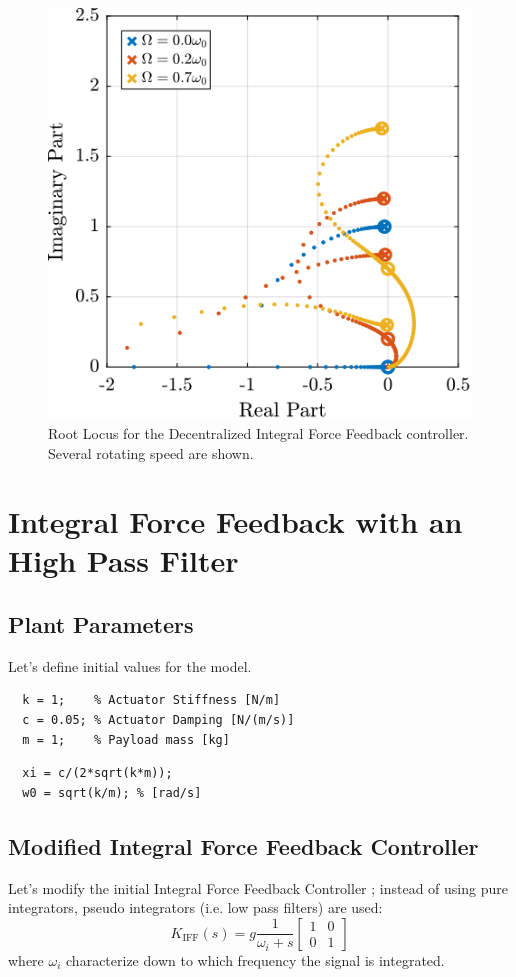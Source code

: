 \documentclass[a4paper, 10pt, DIV=12, parskip=full]{scrreprt}
\begin{document}
\begin{figure}[htbp]
\centering
\includegraphics[scale=1]{figs/root_locus_pure_iff.png}
\caption{\label{fig:root_locus_pure_iff}Root Locus for the Decentralized Integral Force Feedback controller. Several rotating speed are shown.}
\end{figure}

\chapter{Integral Force Feedback with an High Pass Filter}
\label{sec:orgf9854e9}
\label{sec:iff_pseudo_int}

\section{Plant Parameters}
\label{sec:org11b9a15}
Let's define initial values for the model.
\begin{verbatim}
  k = 1;    % Actuator Stiffness [N/m]
  c = 0.05; % Actuator Damping [N/(m/s)]
  m = 1;    % Payload mass [kg]
\end{verbatim}

\begin{verbatim}
  xi = c/(2*sqrt(k*m));
  w0 = sqrt(k/m); % [rad/s]
\end{verbatim}

\section{Modified Integral Force Feedback Controller}
\label{sec:orgf920a8a}
Let's modify the initial Integral Force Feedback Controller ; instead of using pure integrators, pseudo integrators (i.e. low pass filters) are used:
\begin{equation}
  K_{\text{IFF}}(s) = g\frac{1}{\omega_i + s} \begin{bmatrix}
  1 & 0 \\
  0 & 1
\end{bmatrix}
\end{equation}
where \(\omega_i\) characterize down to which frequency the signal is integrated.
\end{document}
